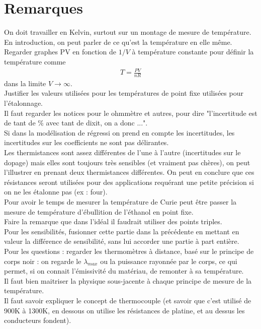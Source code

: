 \documentclass[12pt,prb,aps,epsf]{report}
\begin{document}
\section*{Remarques}
On doit travailler en Kelvin, surtout sur un montage de mesure de température.\\
En introduction, on peut parler de ce qu'est la température en elle même.\\
Regarder graphes PV en fonction de $1/V$ à température constante pour définir la température comme 
\begin{eqnarray}
T = \frac{PV}{nR}
\end{eqnarray}
dans la limite $V\rightarrow \infty$.\\
Justifier les valeurs utilisées pour les températures de point fixe utilisées pour l'étalonnage.\\
Il faut regarder les notices pour le ohmmètre et autres, pour dire "l'incertitude est de tant de \% avec tant de dixit, on a donc ...".\\
Si dans la modélisation de régressi on prend en compte les incertitudes, les incertitudes sur les coefficients ne sont pas délirantes.\\
Les thermistances sont assez différentes de l'une à l'autre (incertitudes sur le dopage) mais elles sont toujours très sensibles (et vraiment pas chères), on peut l'illustrer en prenant deux thermistances différentes. On peut en conclure que ces résistances seront utilisées pour des applications requérant une petite précision si on ne les étalonne pas (ex : four).\\
Pour avoir le temps de mesurer la température de Curie peut être passer la mesure de température d'ébullition de l'éthanol en point fixe.\\
Faire la remarque que dans l'idéal il faudrait utiliser des points triples.\\
Pour les sensibilités, fusionner cette partie dans la précédente en mettant en valeur la différence de sensibilité, sans lui accorder une partie à part entière.\\
Pour les questions : regarder les thermomètres à distance, basé sur le principe de corps noir : on regarde le $\lambda_{max}$ ou la puissance rayonnée par le corps, ce qui permet, si on connait l'émissivité du matériau, de remonter à sa température.\\

Il faut bien maitriser la physique sous-jacente à chaque principe de mesure de la température.\\

Il faut savoir expliquer le concept de thermocouple (et savoir que c'est utilisé de 900K à 1300K, en dessous on utilise les résistances de platine, et au dessus les conducteurs fondent). 
\end{document}

